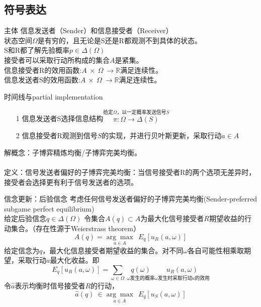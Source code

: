\documentclass{beamer}
\begin{document}
\subsection{符号表达}

\begin{frame}{主体}
	信息发送者（Sender）和信息接受者（Receiver）\\
	状态空间$\Omega$是有穷的，且无论是S还是R都观测不到具体的状态。\\
	S和R都了解先验概率$p\in\Delta\left( \Omega \right) $\\
	接受者可以采取行动所构成的集合$A$是紧集。\\
	信息接受者R的效用函数:$A\ \times \ \Omega \ \to \mathbb{R}$满足连续性。\\
	信息发送者S的效用函数:$A\ \times \ \Omega \ \to \mathbb{R}$满足连续性。
\end{frame}

\begin{frame}{时间线与partial implementation}
	\begin{itemize}
		\item[1] 信息发送者S选择信息结构$\overset{\text{给定}\Omega\text{，以一定概率发送信号}S}{\pi:\Omega \to \Delta\left( S\right)} $
		\item[2] 信息接受者R观测到信号$S$的实现，并进行贝叶斯更新，采取行动$a\in A$
	\end{itemize}
	解概念：子博弈精炼均衡/子博弈完美均衡。\\~\\
	定义：信号发送者偏好的子博弈完美均衡：当信号接受者R的两个选项无差异时，接受者会选择更有利于信号发送者的选项。
\end{frame}

\begin{frame}{信念更新：后验信念}
	考虑任何信号发送者偏好的子博弈完美均衡(Sender-preferred subgame perfect equilibrium)\\
	给定后验信念$q\in\Delta\left( \Omega\right) $
	令集合$A\left( q\right) \subset A$为最大化信号接受者$R$期望收益的行动集合。（存在性源于Weierstrass theorem）
	$$A\left( q\right) =\underset{a\in A}{\arg\max}\ \  E_{q}\left[ u_{R} \left( a,\omega\right) \right] $$\pause 
	给定信念为$q$，最大化信息接受者期望收益的集合。对不同$\omega$各自可能性相乘取期望，采取行动$a$最大化收益。即
	$$E_{q}\left[ u_{R} \left( a,\omega\right) \right]=\sum_{\omega\in\Omega}\ \underset{\omega\text{发生的概率}}{ q\left(\omega\right)} \underset{\omega\text{发生时采取行动}a\text{的效用}}{u_{R}\left(a,\omega \right)} $$\pause
	令$\hat{a}$表示均衡时信号接受者$R$的行动，
	$$\hat{a}\left(q \right) \ \in \underset{a\in A}{\arg\max}\ \  E_{q}\left[ u_{S} \left( a,\omega\right) \right]$$
\end{frame}
\end{document}
